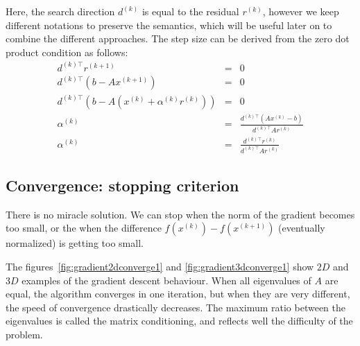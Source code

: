 \documentclass[notitlepage,oneside]{book}
\begin{document}
Here, the search direction $d^{(k)}$ is equal to the residual $r^{(k)}$, however we keep different notations to preserve the semantics,
which will be useful later on to combine the different approaches.
The step size can be derived from the zero dot product condition as follows:
\begin{eqnarray*}
  d^{(k)\top}r^{(k+1)} &= &0 \\
  d^{(k)\top}\left(b-Ax^{(k+1)}\right) &= &0 \\
  d^{(k)\top}\left(b-A(x^{(k)}+\alpha^{(k)} r^{(k)})\right) &= &0 \\
  \alpha^{(k)}   &=& \frac{d^{(k)\top}\left(Ax^{(k)}-b\right)}{d^{(k)\top}Ar^{(k)}}\\
  \alpha^{(k)} &=& \frac{d^{(k)\top}r^{(k)}}{d^{(k)\top}Ar^{(k)}} 
\end{eqnarray*}

\subsection{Convergence: stopping criterion}
There is no miracle solution. We can stop when the norm of the gradient becomes too small,
or the when the difference $f\left(x^{(k)}\right)-f\left(x^{(k+1)}\right)$ (eventually normalized) is getting too small.

The figures~\ref{fig:gradient2dconverge1} and \ref{fig:gradient3dconverge1} show $2D$ and $3D$ examples of the gradient descent behaviour.
When all eigenvalues of $A$ are equal, the algorithm converges in one iteration, but when they are very different, the speed of convergence drastically decreases.
The maximum ratio between the eigenvalues is called the matrix conditioning, and reflects well the difficulty of the problem.
\end{document}
